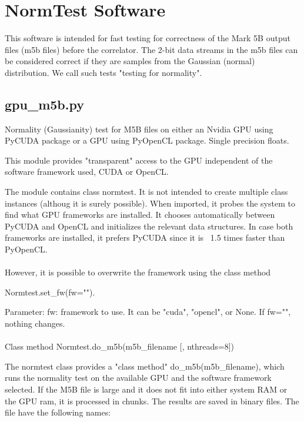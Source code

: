 \documentclass[letterpaper,twoside,12pt]{article}
\begin{document}
\section{NormTest Software}

This software is intended for fast testing for correctness of the Mark 5B output
files (m5b files) before the correlator. The 2-bit data streams in the m5b files
can be considered correct if they are samples from the Gaussian (normal)
distribution. We call such tests "testing for normality".

\subsection{gpu\_m5b.py}

Normality (Gaussianity) test for M5B files on either an Nvidia GPU using PyCUDA
package or a GPU using PyOpenCL package. Single precision floats.

This module provides "transparent" access to the GPU independent of the
software framework used, CUDA or OpenCL.

The module contains class normtest. It is not intended to create multiple
class instances (althoug it is surely possible). When imported, it 
probes the system to find what GPU frameworks are installed. It chooses
automatically between PyCUDA and OpenCL and initializes the relevant 
data structures. In case both frameworks are installed, it prefers
PyCUDA since it is ~1.5 times faster than PyOpenCL. \\


 \\
However, it is possible to overwrite the framework using the class method

Normtest.set_fw(fw="").

Parameter:
    fw: framework to use. It can be "cuda", "opencl", or None.
        If fw="", nothing changes. \\
\\

    Class method Normtest.do_m5b(m5b_filename [, nthreads=8])

The normtest class provides a "class method" do_m5b(m5b_filename),
which runs the normality test on the available GPU and the software
framework selected. If the M5B file is large and it does not fit into either
system RAM or the GPU ram, it is processed in chunks. The results are saved 
in binary files.  The file have the following names:
\end{document}
